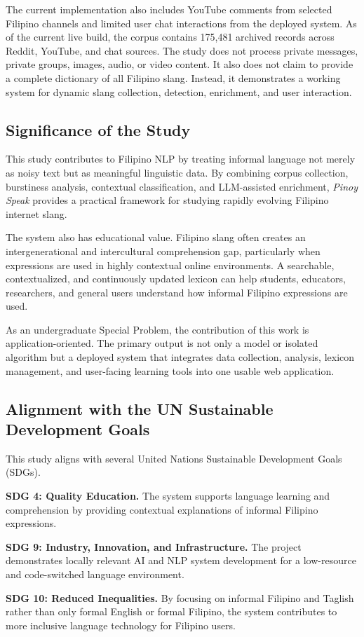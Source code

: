 The current implementation also includes YouTube comments from selected Filipino channels and limited user chat interactions from the deployed system. As of the current live build, the corpus contains 175,481 archived records across Reddit, YouTube, and chat sources. The study does not process private messages, private groups, images, audio, or video content. It also does not claim to provide a complete dictionary of all Filipino slang. Instead, it demonstrates a working system for dynamic slang collection, detection, enrichment, and user interaction.

\subsection{Significance of the Study}
This study contributes to Filipino NLP by treating informal language not merely as noisy text but as meaningful linguistic data. By combining corpus collection, burstiness analysis, contextual classification, and LLM-assisted enrichment, \textit{Pinoy Speak} provides a practical framework for studying rapidly evolving Filipino internet slang.

The system also has educational value. Filipino slang often creates an intergenerational and intercultural comprehension gap, particularly when expressions are used in highly contextual online environments. A searchable, contextualized, and continuously updated lexicon can help students, educators, researchers, and general users understand how informal Filipino expressions are used.

As an undergraduate Special Problem, the contribution of this work is application-oriented. The primary output is not only a model or isolated algorithm but a deployed system that integrates data collection, analysis, lexicon management, and user-facing learning tools into one usable web application.

\subsection{Alignment with the UN Sustainable Development Goals}
This study aligns with several United Nations Sustainable Development Goals (SDGs).

\textbf{SDG 4: Quality Education.} The system supports language learning and comprehension by providing contextual explanations of informal Filipino expressions.

\textbf{SDG 9: Industry, Innovation, and Infrastructure.} The project demonstrates locally relevant AI and NLP system development for a low-resource and code-switched language environment.

\textbf{SDG 10: Reduced Inequalities.} By focusing on informal Filipino and Taglish rather than only formal English or formal Filipino, the system contributes to more inclusive language technology for Filipino users.